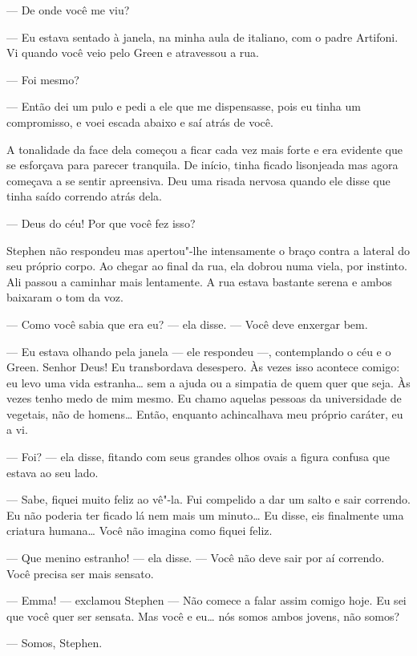 --- De onde você me viu?

--- Eu estava sentado à janela, na minha aula de italiano, com o padre
Artifoni.  Vi quando você veio pelo Green e atravessou a rua.

--- Foi mesmo?

--- Então dei um pulo e pedi a ele que me dispensasse, pois eu tinha um
compromisso, e voei escada abaixo e saí atrás de você.

A tonalidade da face dela começou a ficar cada vez mais forte e era evidente
que se esforçava para parecer tranquila.  De início, tinha ficado lisonjeada
mas agora começava a se sentir apreensiva.  Deu uma risada nervosa quando ele
disse que tinha saído correndo atrás dela.

--- Deus do céu!  Por que você fez isso?

Stephen não respondeu mas apertou"-lhe intensamente o braço contra a lateral do
seu próprio corpo.  Ao chegar ao final da rua, ela dobrou numa viela, por
instinto.  Ali passou a caminhar mais lentamente.  A rua estava bastante serena
e ambos baixaram o tom da voz.

--- Como você sabia que era eu? --- ela disse.  --- Você deve enxergar bem.

--- Eu estava olhando pela janela --- ele respondeu ---, contemplando o céu e o
Green.  Senhor Deus!  Eu transbordava desespero.  Às vezes isso acontece
comigo: eu levo uma vida estranha\ldots{} sem a ajuda ou a simpatia de quem quer que
seja.  Às vezes tenho medo de mim mesmo.  Eu chamo aquelas pessoas da
universidade de vegetais, não de homens\ldots{}  Então, enquanto achincalhava meu
próprio caráter, eu a vi.

--- Foi? --- ela disse, fitando com seus grandes olhos ovais a figura confusa
que estava ao seu lado.

--- Sabe, fiquei muito feliz ao vê"-la.  Fui compelido a dar um salto e sair
correndo.  Eu não poderia ter ficado lá nem mais um minuto\ldots{}  Eu disse, eis
finalmente uma criatura humana\ldots{}  Você não imagina como fiquei feliz.

--- Que menino estranho! --- ela disse.  --- Você não deve sair por aí
correndo.  Você precisa ser mais sensato.

--- Emma! --- exclamou Stephen --- Não comece a falar assim comigo hoje.  Eu
sei que você quer ser sensata.  Mas você e eu\ldots{} nós somos ambos jovens, não
somos?

--- Somos, Stephen.

